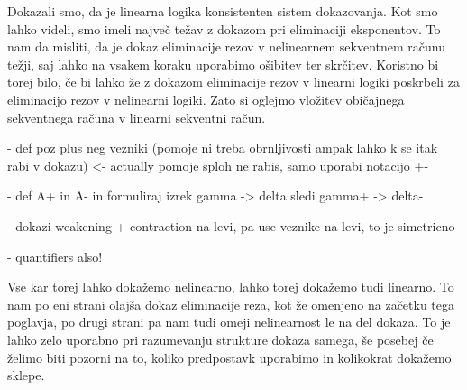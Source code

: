 Dokazali smo, da je linearna logika konsistenten sistem dokazovanja. Kot smo lahko videli, smo imeli največ težav z dokazom pri eliminaciji eksponentov. To nam da misliti, da je dokaz eliminacije rezov v nelinearnem sekventnem računu težji, saj lahko na vsakem koraku uporabimo ošibitev ter skrčitev. Koristno bi torej bilo, če bi lahko že z dokazom eliminacije rezov v linearni logiki poskrbeli za eliminacijo rezov v nelinearni logiki. Zato si oglejmo vložitev običajnega sekventnega računa v linearni sekventni račun.

\begin{primer}
    - def poz plus neg vezniki (pomoje ni treba obrnljivosti ampak lahko k se itak rabi v dokazu) <- actually pomoje sploh ne rabis, samo uporabi notacijo +-

    - def A+ in A- in formuliraj izrek gamma -> delta sledi gamma+ -> delta-

    - dokazi weakening + contraction na levi, pa use veznike na levi, to je simetricno

    - quantifiers also!
\end{primer}

Vse kar torej lahko dokažemo nelinearno, lahko torej dokažemo tudi linearno. To nam po eni strani olajša dokaz eliminacije reza, kot že omenjeno na začetku tega poglavja, po drugi strani pa nam tudi omeji nelinearnost le na del dokaza. To je lahko zelo uporabno pri razumevanju strukture dokaza samega, še posebej če želimo biti pozorni na to, koliko predpostavk uporabimo in kolikokrat dokažemo sklepe.
